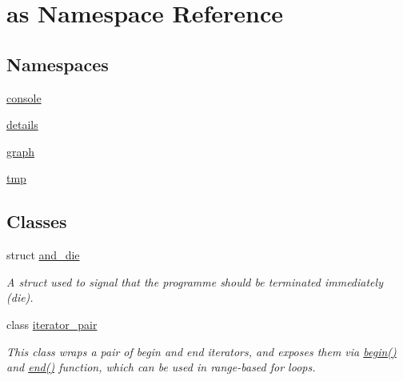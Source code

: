 \hypertarget{namespaceas}{}\section{as Namespace Reference}
\label{namespaceas}
\subsection*{Namespaces}
\begin{DoxyCompactItemize}
\item 
 \hyperlink{namespaceas_1_1console}{console}
\item 
 \hyperlink{namespaceas_1_1details}{details}
\item 
 \hyperlink{namespaceas_1_1graph}{graph}
\item 
 \hyperlink{namespaceas_1_1tmp}{tmp}
\end{DoxyCompactItemize}
\subsection*{Classes}
\begin{DoxyCompactItemize}
\item 
struct \hyperlink{structas_1_1and__die}{and\+\_\+die}
\begin{DoxyCompactList}\small\item\em A struct used to signal that the programme should be terminated immediately (die). \end{DoxyCompactList}\item 
class \hyperlink{classas_1_1iterator__pair}{iterator\+\_\+pair}
\begin{DoxyCompactList}\small\item\em This class wraps a pair of begin and end iterators, and exposes them via \hyperlink{classas_1_1iterator__pair_a88c00afafd5ee4477b7ab2a1a89bb746}{begin()} and \hyperlink{classas_1_1iterator__pair_ae7cef6e91faecd20e6aebd2f21b29b41}{end()} function, which can be used in range-\/based for loops. \end{DoxyCompactList}\end{DoxyCompactItemize}
